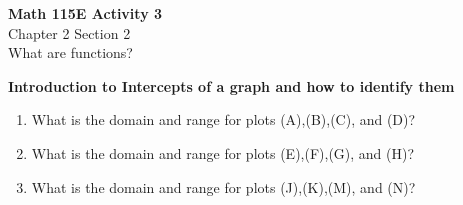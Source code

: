 \documentclass{article}
\begin{document}
\begin{center}
    \Large \textbf{Math 115E Activity 3} \\
    \vspace{0.2cm}
    \normalsize Chapter 2 Section 2 \\
    \normalsize What are functions?
\end{center}
\vspace{0.5cm}
\textbf{Introduction to Intercepts of a graph and how to identify them}

\noindent
\begin{minipage}[c]{0.45\textwidth}
    \begin{enumerate}
        \vspace{-2cm}
        \item What is the domain and range for plots (A),(B),(C), and (D)?
        \vspace{6cm}
        \item What is the domain and range for plots (E),(F),(G), and (H)?
        \vspace{6cm}
        \item What is the domain and range for plots (J),(K),(M), and (N)?   


    \end{enumerate}
\end{minipage}%
\hfill
\end{document}
